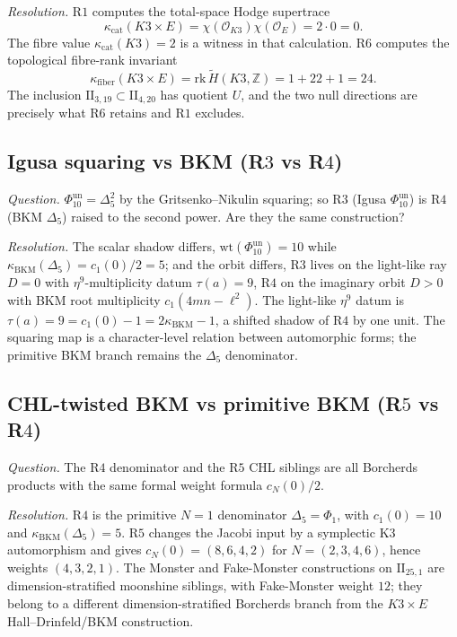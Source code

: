 \documentclass[11pt]{article}
\begin{document}
\emph{Resolution.} R$1$ computes the total-space Hodge supertrace
\[
\kappa_{\mathrm{cat}}(K3\times E)=
\chi(\mathcal O_{K3})\chi(\mathcal O_E)=2\cdot 0=0.
\]
The fibre value $\kappa_{\mathrm{cat}}(K3)=2$ is a witness in that
calculation. R$6$ computes the topological fibre-rank invariant
\[
\kappa_{\mathrm{fiber}}(K3\times E)=
\mathrm{rk}\,\widetilde H(K3,\mathbb Z)=1+22+1=24.
\]
The inclusion $\mathrm{II}_{3,19}\subset\mathrm{II}_{4,20}$ has
quotient $U$, and the two null directions are precisely what R$6$
retains and R$1$ excludes.

\subsection{Igusa squaring vs BKM (R$3$ vs R$4$)}
\label{subsec:route-igusa-bkm}

\emph{Question.} $\Phi_{10}^{\mathrm{un}} = \Delta_5^2$ by the Gritsenko--Nikulin
squaring; so R$3$ (Igusa $\Phi_{10}^{\mathrm{un}}$) is R$4$ (BKM $\Delta_5$)
raised to the second power. Are they the same construction?

\emph{Resolution.} The scalar shadow differs,
$\mathrm{wt}(\Phi_{10}^{\mathrm{un}})=10$ while
$\kappa_{\mathrm{BKM}}(\Delta_5) = c_1(0)/2 = 5$; and the
orbit differs, R$3$ lives on the light-like ray $D = 0$
with $\eta^9$-multiplicity datum $\tau(a) = 9$, R$4$ on the
imaginary orbit $D > 0$ with BKM root multiplicity
$c_1(4mn - \ell^2)$. The light-like $\eta^9$ datum is
$\tau(a) = 9 = c_1(0) - 1 = 2\kappa_{\mathrm{BKM}} - 1$, a
shifted shadow of R$4$ by one unit. The squaring map is a
character-level relation between automorphic forms; the primitive
BKM branch remains the $\Delta_5$ denominator.

\subsection{CHL-twisted BKM vs primitive BKM (R$5$ vs R$4$)}
\label{subsec:route-chl-bkm}

\emph{Question.} The R$4$ denominator and the R$5$ CHL siblings are all
Borcherds products with the same formal weight formula
$c_N(0)/2$.

\emph{Resolution.} R$4$ is the primitive $N=1$ denominator
$\Delta_5=\Phi_1$, with $c_1(0)=10$ and
$\kappa_{\mathrm{BKM}}(\Delta_5)=5$. R$5$ changes the Jacobi input by
a symplectic K3 automorphism and gives
$c_N(0)=(8,6,4,2)$ for $N=(2,3,4,6)$, hence weights
$(4,3,2,1)$. The Monster and Fake-Monster constructions on
$\mathrm{II}_{25,1}$ are dimension-stratified moonshine siblings,
with Fake-Monster weight $12$; they belong to a different
dimension-stratified Borcherds branch from the $K3\times E$
Hall--Drinfeld/BKM construction.
\end{document}
